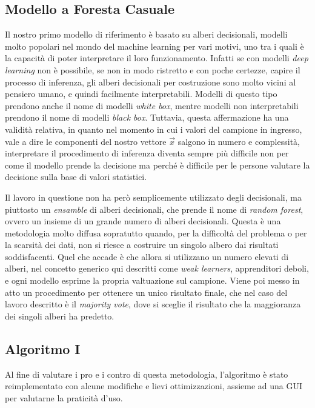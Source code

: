\subsection{\label{sec:shallow-learning}Modello a Foresta Casuale}

Il nostro primo modello di riferimento\cite{Toma2022} è basato su
alberi decisionali, modelli molto popolari nel mondo del machine learning
per vari motivi, uno tra i quali è la capacità di poter interpretare il loro funzionamento.
Infatti se con modelli {\it deep learning} non è possibile, se non in
modo ristretto e con poche certezze, capire il processo di inferenza, 
gli alberi decisionali per costruzione sono molto
vicini al pensiero umano, e quindi facilmente interpretabili.
Modelli di questo tipo prendono anche il nome di modelli {\it white box},
mentre modelli non interpretabili prendono il nome di modelli {\it black box}.
Tuttavia, questa affermazione ha una validità relativa, in quanto
nel momento in cui i valori del campione in ingresso, vale a dire le
componenti del nostro vettore $\vec{x}$ salgono in numero e complessità,
interpretare il procedimento di inferenza diventa sempre più difficile non per
come il modello prende la decisione ma perché è difficile per le persone
valutare la decisione sulla base di valori statistici.

Il lavoro in questione non ha però semplicemente utilizzato degli decisionali,
ma piuttosto un {\it ensamble} di alberi decisionali, che prende il nome
di {\it random forest}, ovvero un insieme di un grande numero di alberi decisionali.
Questa è una metodologia molto diffusa sopratutto quando, per la difficoltà del
problema o per la scarsità dei dati, non si riesce a costruire un singolo
albero dai risultati soddisfacenti.
Quel che accade è che allora si utilizzano un numero elevati di alberi,
nel concetto generico qui descritti come {\it weak learners}, apprenditori
deboli, e ogni modello esprime la propria valtuazione sul campione.
Viene poi messo in atto un procedimento per ottenere un unico risultato finale,
che nel caso del lavoro descritto è il {\it majority vote}, dove si sceglie
il risultato che la maggioranza dei singoli alberi ha predetto.

\subsection{Algoritmo I}

Al fine di valutare i pro e i contro di questa metodologia, l'algoritmo
è stato reimplementato con alcune modifiche e lievi ottimizzazioni, assieme ad una
GUI per valutarne la praticità d'uso.

